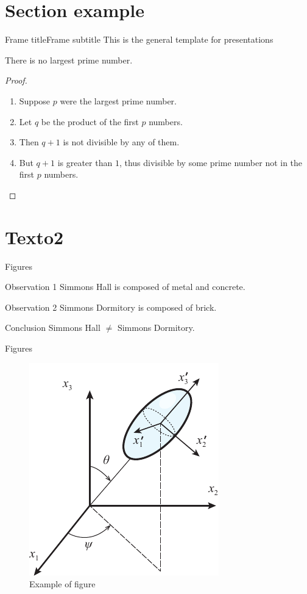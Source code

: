 \begin{frame}{}
	\tableofcontents
\end{frame}

\section{Section example}
\begin{frame}{Frame title}{Frame subtitle}
	This is the general template for presentations
	\begin{theorem}
		There is no largest prime number.
	\end{theorem}
	\begin{proof}
		\begin{enumerate}
			\item<1-> Suppose $p$ were the largest prime number.
			\item<2-> Let $q$ be the product of the first $p$ numbers.
			\item<3-> Then $q + 1$ is not divisible by any of them.
			\item<4-> But $q + 1$ is greater than $1$, thus divisible by some 
			prime number not in the first $p$ numbers.\qedhere
		\end{enumerate}
	\end{proof}
\end{frame}



\section{Texto2}
\begin{frame}{Figures}
	\begin{block}{Observation 1}
		Simmons Hall is composed of metal and concrete.
	\end{block}
	\begin{exampleblock}{Observation 2}
		Simmons Dormitory is composed of brick.
	\end{exampleblock}
	\begin{alertblock}{Conclusion}
		Simmons Hall $\not=$ Simmons Dormitory.
	\end{alertblock}
\end{frame}

\begin{frame}{Figures}
	\begin{figure}
		\centering
		\includegraphics[width=0.3\linewidth]{figures/eulerang.pdf}
		\caption{Example of figure}
	\end{figure}
\end{frame}

